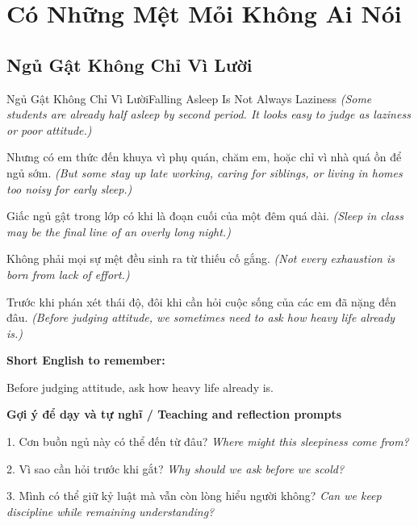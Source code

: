 \chapter{Có Những Mệt Mỏi Không Ai Nói}

\section{Ngủ Gật Không Chỉ Vì Lười}
\begin{truyen}{Ngủ Gật Không Chỉ Vì Lười}{Falling Asleep Is Not Always Laziness}
\textit{(Some students are already half asleep by second period. It looks easy to judge as laziness or poor attitude.)}

Nhưng có em thức đến khuya vì phụ quán, chăm em, hoặc chỉ vì nhà quá ồn để ngủ sớm.
\textit{(But some stay up late working, caring for siblings, or living in homes too noisy for early sleep.)}

Giấc ngủ gật trong lớp có khi là đoạn cuối của một đêm quá dài.
\textit{(Sleep in class may be the final line of an overly long night.)}

Không phải mọi sự mệt đều sinh ra từ thiếu cố gắng.
\textit{(Not every exhaustion is born from lack of effort.)}

\end{truyen}

\begin{baihoc}
Trước khi phán xét thái độ, đôi khi cần hỏi cuộc sống của các em đã nặng đến đâu.
\textit{(Before judging attitude, we sometimes need to ask how heavy life already is.)}
\end{baihoc}

\begin{ghinhoanh}
\textbf{Short English to remember:}

Before judging attitude, ask how heavy life already is.

\end{ghinhoanh}

\begin{tuhocnhanh}
\textbf{Gợi ý để dạy và tự nghĩ / Teaching and reflection prompts}

1. Cơn buồn ngủ này có thể đến từ đâu? \textit{Where might this sleepiness come from?}

2. Vì sao cần hỏi trước khi gắt? \textit{Why should we ask before we scold?}

3. Mình có thể giữ kỷ luật mà vẫn còn lòng hiểu người không? \textit{Can we keep discipline while remaining understanding?}
\end{tuhocnhanh}
\ngancach

